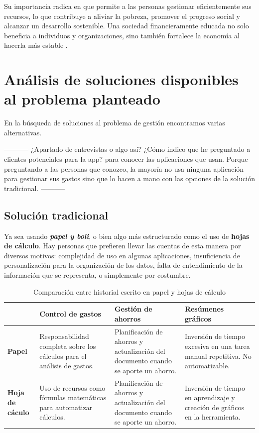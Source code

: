 Su importancia radica en que permite a las personas gestionar eficientemente sus recursos, 
lo que contribuye a aliviar la pobreza, promover el progreso social y alcanzar un 
desarrollo sostenible. Una sociedad financieramente educada no solo beneficia a individuos 
y organizaciones, sino también fortalece la economía al hacerla más estable \cite{capituloIX}
\cite{ariza2024educacion}\cite{sarango2023educacion}.


\section{Análisis de soluciones disponibles al problema planteado}
En la búsqueda de soluciones al problema de gestión encontramos varias alternativas. 

-----------
¿Apartado de entrevistas o algo así?
¿Cómo indico que he preguntado a clientes potenciales para la app? para 
conocer las aplicaciones que usan. Porque preguntando a las personas 
que conozco, la mayoría no usa ninguna aplicación para gestionar sus gastos
sino que lo hacen a mano con las opciones de la solución tradicional.
-----------

\subsection{Solución tradicional}
Ya sea usando \textit{\textbf{papel y boli}}, o bien algo más 
estructurado como el uso de \textbf{hojas de cálculo}. Hay personas que prefieren llevar las 
cuentas de esta manera por diversos motivos: complejidad de uso en algunas aplicaciones, 
insuficiencia de personalización para la organización de los datos, falta de entendimiento 
de la información que se representa, o simplemente por costumbre.

\begin{table}[ht!]
    \centering
    \renewcommand{\arraystretch}{1.2}
    \begin{tabular}{|p{3cm}|p{3cm}|p{3cm}|p{3cm}|}
    \hline
    \textbf{} & \textbf{Control de gastos} & \textbf{Gestión de ahorros} & \textbf{Resúmenes gráficos} \\ \hline
    
    \textbf{Papel} & 
    Responsabilidad completa sobre los cálculos para el análisis de gastos. & 
    Planificación de ahorros y actualización del documento cuando se aporte un ahorro. & 
    Inversión de tiempo excesiva en una tarea manual repetitiva. No automatizable. \\ \hline
    
    \textbf{Hoja de cáculo} & 
    Uso de recursos como fórmulas matemáticas para automatizar cálculos. & 
    Planificación de ahorros y actualización del documento cuando se aporte un ahorro. & 
    Inversión de tiempo en aprendizaje y creación de gráficos en la herramienta. \\ \hline

    \end{tabular}
    \caption{Comparación entre historial escrito en papel y hojas de cálculo}
    \label{tab:solucion_tradicional}
\end{table}

